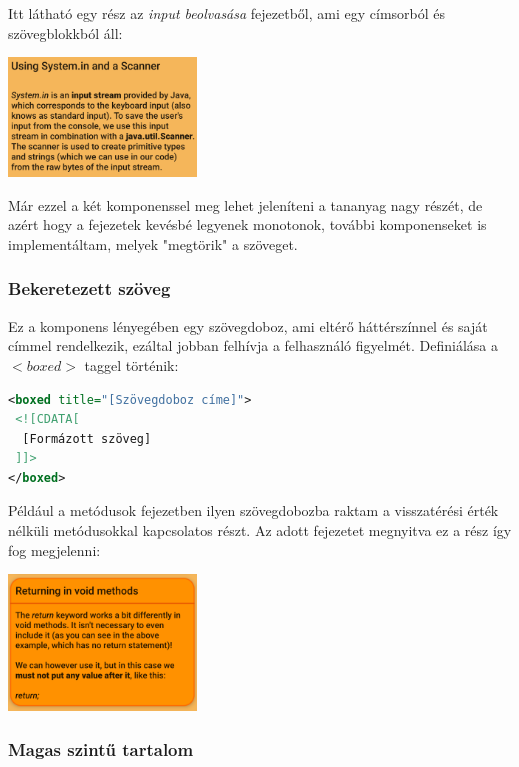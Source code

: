 \documentclass[12pt,a4paper]{article}
\begin{document}
	Itt látható egy rész az \textit{input beolvasása} fejezetből, ami egy címsorból és szövegblokkból áll:
	
	\begin{center}
		\includegraphics[width=5cm]{title_text_component}
	\end{center}
	
	Már ezzel a két komponenssel meg lehet jeleníteni a tananyag nagy részét, de azért hogy a fejezetek kevésbé legyenek monotonok, további komponenseket is implementáltam, melyek "megtörik" a szöveget. 
	
	\subsubsection{Bekeretezett szöveg}
	
	Ez a komponens lényegében egy szövegdoboz, ami eltérő háttérszínnel és saját címmel rendelkezik, ezáltal jobban felhívja a felhasználó figyelmét. Definiálása a $<boxed>$ taggel történik:
	
	\bigskip
	\begin{lstlisting}[language=XML]
<boxed title="[Szövegdoboz címe]">
 <![CDATA[
  [Formázott szöveg]
 ]]>
</boxed>	
	\end{lstlisting}
	\bigskip

	Például a metódusok fejezetben ilyen szövegdobozba raktam a visszatérési érték nélküli metódusokkal kapcsolatos részt.
	Az adott fejezetet megnyitva ez a rész így fog megjelenni:
	
	\begin{center}
		\includegraphics[width=5cm]{boxed_component}
	\end{center}
	
	\subsubsection{Magas szintű tartalom}
	
\end{document}
